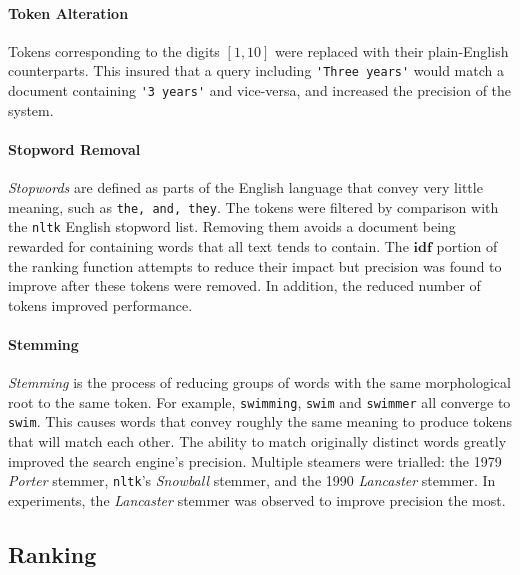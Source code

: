 \documentclass[10pt, a4paper, twocolumn]{article}   	%
\begin{document}
\paragraph{Token Alteration}
Tokens corresponding to the digits $[1, 10]$ were replaced with their plain-English counterparts. This insured that a query including \verb|'Three years'| would match a document containing \verb|'3 years'| and vice-versa, and increased the precision of the system.

\paragraph{Stopword Removal}
\emph{Stopwords} are defined as parts of the English language that convey very little meaning, such as \verb|the, and, they|.
The tokens were filtered by comparison with the \verb|nltk| English stopword list. Removing them avoids a document being rewarded for containing words that all text tends to contain. The $\mathbf{idf}$ portion of the ranking function attempts to reduce their impact but precision was found to improve after these tokens were removed. In addition, the reduced number of tokens improved performance.

\paragraph{Stemming}
\emph{Stemming} is the process of reducing groups of words with the same morphological root to the same token. For example, \verb|swimming|, \verb|swim| and \verb|swimmer| all converge to \verb|swim|. This causes words that convey roughly the same meaning to produce tokens that will match each other. The ability to match originally distinct words greatly improved the search engine's precision. Multiple steamers were trialled: the 1979 \emph{Porter} stemmer, \verb|nltk|'s \emph{Snowball} stemmer, and the 1990 \emph{Lancaster} stemmer. In experiments, the \emph{Lancaster} stemmer was observed to improve precision the most.

\subsection{Ranking}
\end{document}
